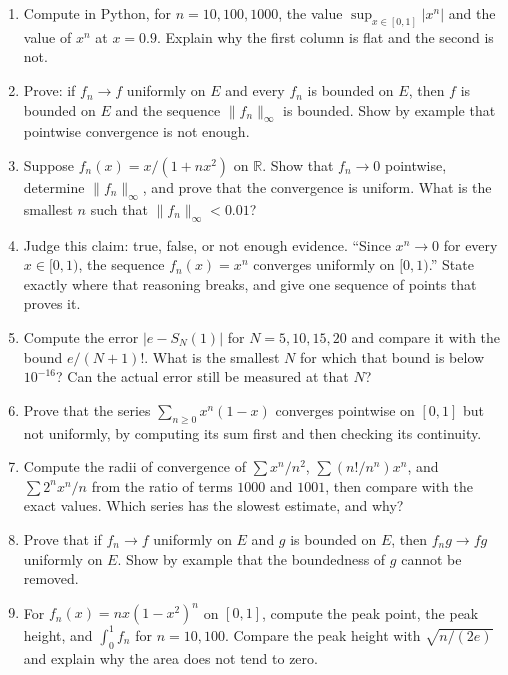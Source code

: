 \begin{latihan}
\begin{enumerate}
\item Compute in Python, for $n=10,100,1000$, the value
      $\sup_{x\in[0,1]}|x^n|$ and the value of $x^n$ at $x=0.9$. Explain why
      the first column is flat and the second is not.

\item Prove: if $f_n\to f$ uniformly on $E$ and every $f_n$ is bounded on
      $E$, then $f$ is bounded on $E$ and the sequence $\|f_n\|_\infty$ is bounded.
      Show by example that pointwise convergence is not enough.

\item Suppose $f_n(x)=x/(1+nx^2)$ on $\mathbb{R}$. Show that
      $f_n\to0$ pointwise, determine $\|f_n\|_\infty$, and prove that
      the convergence is uniform. What is the smallest $n$ such that
      $\|f_n\|_\infty<0.01$?

\item Judge this claim: true, false, or not enough evidence. ``Since $x^n\to0$
      for every $x\in[0,1)$, the sequence $f_n(x)=x^n$ converges uniformly on
      $[0,1)$.'' State exactly where that reasoning breaks, and give one
      sequence of points that proves it.

\item Compute the error $|e-S_N(1)|$ for $N=5,10,15,20$ and compare it with
      the bound $e/(N+1)!$. What is the smallest $N$ for which that bound is below
      $10^{-16}$? Can the actual error still be measured at that $N$?

\item Prove that the series $\sum_{n\ge0}x^n(1-x)$ converges pointwise
      on $[0,1]$ but not uniformly, by computing its sum first
      and then checking its continuity.

\item Compute the radii of convergence of $\sum x^n/n^2$, $\sum(n!/n^n)x^n$, and
      $\sum 2^nx^n/n$ from the ratio of terms $1000$ and $1001$, then compare
      with the exact values. Which series has the slowest estimate, and
      why?

\item Prove that if $f_n\to f$ uniformly on $E$ and $g$ is bounded on $E$,
      then $f_ng\to fg$ uniformly on $E$. Show by example that the
      boundedness of $g$ cannot be removed.

\item For $f_n(x)=nx(1-x^2)^n$ on $[0,1]$, compute the peak point, the peak
      height, and $\int_0^1f_n$ for $n=10,100$. Compare the peak height
      with $\sqrt{n/(2e)}$ and explain why the area does not tend to zero.


\end{enumerate}
\end{latihan}
